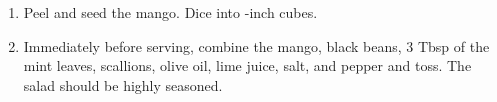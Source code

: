 
\begin{ingredients}
\end{ingredients}


\begin{recipe}
  \begin{enumerate}

  \item Peel and seed the mango.  Dice into \fracH-inch cubes.

  \item Immediately before serving, combine the mango, black beans, 3
    Tbsp of the mint leaves, scallions, olive oil, lime juice, salt,
    and pepper and toss.  The salad should be highly seasoned.

  \end{enumerate}
\end{recipe}


